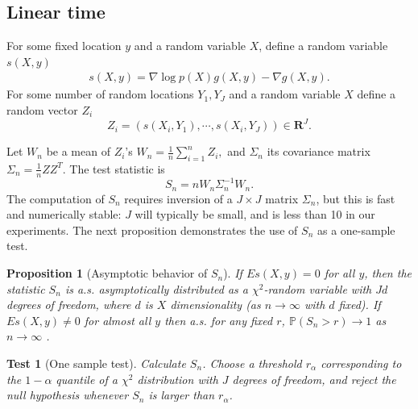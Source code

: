 \documentclass{article}
\newtheorem{test}{Test}
\newtheorem{proposition}{Proposition}
\begin{document}
\appendix


\subsection{Linear time}

For some fixed location $y$ and a random variable $X$, define a random variable $s(X,y)$
\begin{align}
 s(X,y) = \nabla \log p(X) g(X,y) -  \nabla g(X,y).
\end{align}
For some number of random locations $Y_1,Y_J$ and a random variable $X$ define a random vector $Z_i$
\begin{equation}
 Z_i = ( s(X_i,Y_1) , \cdots, s(X_i,Y_J)  )\in \mathbf R^J.
\end{equation}

Let $W_n$ be a mean of $Z_i$'s
$W_n = \frac 1  n \sum_{i=1}^n Z_i, $
and $\Sigma_n$ its  covariance matrix
$\Sigma_n = \frac 1  n Z Z^{T}$.
The test statistic is
\begin{equation}
 S_n = n W_n \Sigma_n^{-1} W_n.
\end{equation}
The computation of $S_n$ requires inversion of a $J\times J$ matrix $\Sigma_n$, but this is fast and numerically stable: $J$ will typically be small, and is less than 10 in our experiments. The next proposition demonstrates the use of $S_n$ as a one-sample test.
\begin{proposition}[Asymptotic behavior of $S_n$]
\label{prop:Hotelling}
 If  $E s(X,y)=0$ for all $y$, then the statistic $S_n$ is a.s. asymptotically distributed as a $\chi^2$-random variable with $Jd$ degrees of freedom, where $d$ is $X$ dimensionality (as $n \to \infty$ with $d$ fixed). If  $E s(X,y) \neq 0$ for almost all $y$ then a.s. for any fixed $r$, $\mathbb P(S_n > r) \to 1$  as $n \to \infty$ .
\end{proposition}


\begin{test}[One sample test]
\label{test}
Calculate $S_n$. Choose a threshold $r_\alpha$ corresponding to the $1-\alpha$ quantile of a  $\chi^2$ distribution with $J$ degrees of freedom, and reject the null hypothesis whenever $S_n$ is larger than $r_\alpha$. 
\end{test}





\end{document}
